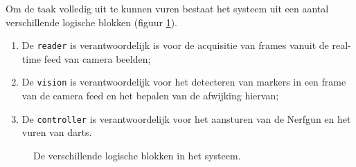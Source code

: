 \pagebreak

Om de taak volledig uit te kunnen vuren bestaat het systeem uit een aantal
verschillende logische blokken (figuur \ref{fig:ipo-main}).

\begin{enumerate}
    \item De \texttt{reader} is verantwoordelijk is voor de acquisitie
        van frames vanuit de real-time feed van camera beelden;
    \item De \texttt{vision} is verantwoordelijk voor het detecteren van
        markers in een frame van de camera feed en het bepalen van de
        afwijking hiervan;
    \item De \texttt{controller} is verantwoordelijk voor het aansturen van
        de Nerfgun en het vuren van darts.
\end{enumerate}

\begin{figure}[H]
    \begin{center}
        
    \end{center}
    \caption{De verschillende logische blokken in het \autonerf systeem.}
    \label{fig:ipo-main}
\end{figure}
